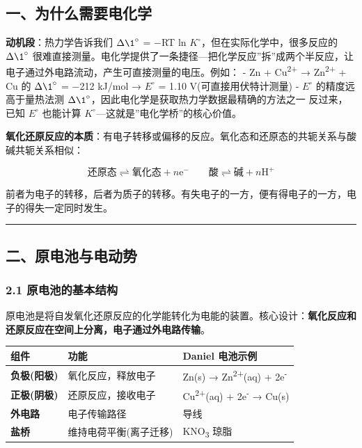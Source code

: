 \subsection{一、为什么需要电化学}\label{ux4e00ux4e3aux4ec0ux4e48ux9700ux8981ux7535ux5316ux5b66}

\textbf{动机段}：热力学告诉我们 \(\Delta \1^{\circ}\) = −RT ln \(K^{\circ}\)，但在实际化学中，很多反应的 \(\Delta \1^{\circ}\) 很难直接测量。电化学提供了一条捷径---把化学反应''拆''成两个半反应，让电子通过外电路流动，产生可直接测量的电压。例如：
- Zn + Cu\textsuperscript{2+} → Zn\textsuperscript{2+} + Cu 的 \(\Delta \1^{\circ}\) = −212 kJ/mol → \(E^{\circ}\) = 1.10 V(可直接用伏特计测量)
- \(E^{\circ}\) 的精度远高于量热法测 \(\Delta \1^{\circ}\)，因此电化学是获取热力学数据最精确的方法之一
反过来，已知 \(E^{\circ}\) 也能计算 \(K^{\circ}\)---这就是''电化学桥''的核心价值。

\textbf{氧化还原反应的本质}：有电子转移或偏移的反应。氧化态和还原态的共轭关系与酸碱共轭关系相似：

\[
\text{还原态} \rightleftharpoons \text{氧化态} + n\mathrm{e}^- \qquad \text{酸} \rightleftharpoons \text{碱} + n\mathrm{H}^+
\]

前者为电子的转移，后者为质子的转移。有失电子的一方，便有得电子的一方，电子的得失一定同时发生。

\begin{center}\rule{0.5\linewidth}{0.5pt}\end{center}

\subsection{二、原电池与电动势}\label{ux4e8cux539fux7535ux6c60ux4e0eux7535ux52a8ux52bf}

\subsubsection{2.1 原电池的基本结构}\label{ux539fux7535ux6c60ux7684ux57faux672cux7ed3ux6784}

原电池是将自发氧化还原反应的化学能转化为电能的装置。核心设计：\textbf{氧化反应和还原反应在空间上分离，电子通过外电路传输}。

{\def\LTcaptype{none} %
\begin{longtable}[]{@{}lll@{}}
\toprule\noalign{}
组件 & 功能 & Daniel 电池示例 \\
\midrule\noalign{}
\endhead
\bottomrule\noalign{}
\endlastfoot
\textbf{负极(阳极)} & 氧化反应，释放电子 & Zn(s) → Zn\textsuperscript{2+}(aq) + 2e\textsuperscript{-} \\
\textbf{正极(阴极)} & 还原反应，接收电子 & Cu\textsuperscript{2+}(aq) + 2e\textsuperscript{-} → Cu(s) \\
\textbf{外电路} & 电子传输路径 & 导线 \\
\textbf{盐桥} & 维持电荷平衡(离子迁移) & KNO\textsubscript{3} 琼脂 \\
\end{longtable}
}

